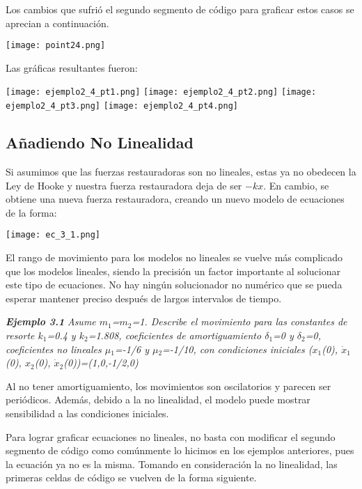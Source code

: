 \documentclass{article}
\begin{document}
Los cambios que sufrió el segundo segmento de código para graficar estos casos se aprecian a continuación.

\begin{center}
\texttt{[image: point24.png]}
\end{center}

Las gráficas resultantes fueron:

\begin{center}
\texttt{[image: ejemplo2\_4\_pt1.png]}
\texttt{[image: ejemplo2\_4\_pt2.png]}
\texttt{[image: ejemplo2\_4\_pt3.png]}
\texttt{[image: ejemplo2\_4\_pt4.png]}
\end{center}

\subsection{Añadiendo No Linealidad}
Si asumimos que las fuerzas restauradoras son no lineales, estas ya no obedecen la Ley de Hooke y nuestra fuerza restauradora deja de ser $-kx$. En cambio, se obtiene una nueva fuerza restauradora, creando un nuevo modelo de ecuaciones de la forma:

\begin{center}
\texttt{[image: ec\_3\_1.png]}
\end{center}

El rango de movimiento para los modelos no lineales se vuelve más complicado que los modelos lineales, siendo la precisión un factor importante al solucionar este tipo de ecuaciones. No hay ningún solucionador no numérico que se pueda esperar mantener preciso después de largos intervalos de tiempo.

\textbf{\textit{Ejemplo 3.1}}
\textit{Asume $m_1$=$m_2$=1. Describe el movimiento para las constantes de resorte $k_1$=0.4 y $k_2$=1.808, coeficientes de amortiguamiento $\delta$$_1$=0 y $\delta$$_2$=0, coeficientes no lineales $\mu$$_1$=-1/6 y $\mu$$_2$=-1/10, con condiciones iniciales ($x_1$(0), $\dot{x}_1$(0), $x_2$(0), $\dot{x}_2$(0))=(1,0,-1/2,0)}

Al no tener amortiguamiento, los movimientos son oscilatorios y parecen ser periódicos. Además, debido a la no linealidad, el modelo puede mostrar sensibilidad a las condiciones iniciales.

Para lograr graficar ecuaciones no lineales, no basta con modificar el segundo segmento de código como comúnmente lo hicimos en los ejemplos anteriores, pues la ecuación ya no es la misma. Tomando en consideración la no linealidad, las primeras celdas de código se vuelven de la forma siguiente.
\end{document}

